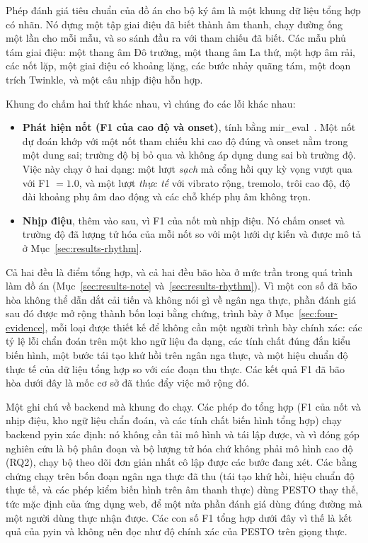 \documentclass[12pt,a4paper]{article}
\begin{document}
Phép đánh giá tiêu chuẩn của đồ án cho bộ ký âm là một khung dữ liệu tổng hợp có
nhãn. Nó dựng một tập giai điệu đã biết thành âm thanh, chạy đường ống một lần cho
mỗi mẫu, và so sánh đầu ra với tham chiếu đã biết. Các mẫu phủ tám giai điệu: một
thang âm Đô trưởng, một thang âm La thứ, một hợp âm rải, các nốt lặp, một giai điệu
có khoảng lặng, các bước nhảy quãng tám, một đoạn trích Twinkle, và một câu nhịp
điệu hỗn hợp.

Khung đo chấm hai thứ khác nhau, vì chúng đo các lỗi khác nhau:

\begin{itemize}
    \item \textbf{Phát hiện nốt (F1 của cao độ và onset)}, tính bằng
    mir\_eval~\cite{mireval}. Một nốt dự đoán khớp với một nốt tham chiếu khi cao độ
    đúng và onset nằm trong một dung sai; trường độ bị bỏ qua và không áp dụng dung
    sai bù trường độ. Việc này chạy ở hai dạng: một lượt \emph{sạch} mà cổng hồi quy
    kỳ vọng vượt qua với F1 $=1.0$, và một lượt \emph{thực tế} với vibrato rộng,
    tremolo, trôi cao độ, độ dài khoảng phụ âm dao động và các chỗ khép phụ âm không
    trọn.
    \item \textbf{Nhịp điệu}, thêm vào sau, vì F1 của nốt mù nhịp điệu. Nó chấm
    onset và trường độ đã lượng tử hóa của mỗi nốt so với một lưới dự kiến và được
    mô tả ở Mục~\ref{sec:results-rhythm}.
\end{itemize}

Cả hai đều là điểm tổng hợp, và cả hai đều bão hòa ở mức trần trong quá trình làm đồ
án (Mục~\ref{sec:results-note} và~\ref{sec:results-rhythm}). Vì một con số đã bão
hòa không thể dẫn dắt cải tiến và không nói gì về ngân nga thực, phần đánh giá sau
đó được mở rộng thành bốn loại bằng chứng, trình bày ở Mục~\ref{sec:four-evidence},
mỗi loại được thiết kế để không cần một người trình bày chính xác: các tỷ lệ lỗi
chẩn đoán trên một kho ngữ liệu đa dạng, các tính chất đúng đắn kiểu biến hình, một
bước tái tạo khứ hồi trên ngân nga thực, và một hiệu chuẩn độ thực tế của dữ liệu
tổng hợp so với các đoạn thu thực. Các kết quả F1 đã bão hòa dưới đây là mốc cơ sở
đã thúc đẩy việc mở rộng đó.

Một ghi chú về backend mà khung đo chạy. Các phép đo tổng hợp (F1 của nốt và nhịp
điệu, kho ngữ liệu chẩn đoán, và các tính chất biến hình tổng hợp) chạy backend
pyin xác định: nó không cần tải mô hình và tái lập được, và vì đóng góp nghiên cứu
là bộ phân đoạn và bộ lượng tử hóa chứ không phải mô hình cao độ (RQ2), chạy bộ theo
dõi đơn giản nhất cô lập được các bước đang xét. Các bằng chứng chạy trên bốn đoạn
ngân nga thực đã thu (tái tạo khứ hồi, hiệu chuẩn độ thực tế, và các phép kiểm biến
hình trên âm thanh thực) dùng PESTO thay thế, tức mặc định của ứng dụng web, để một
nửa phần đánh giá dùng đúng đường mà một người dùng thực nhận được. Các con số F1
tổng hợp dưới đây vì thế là kết quả của pyin và không nên đọc như độ chính xác của
PESTO trên giọng thực.
\end{document}
